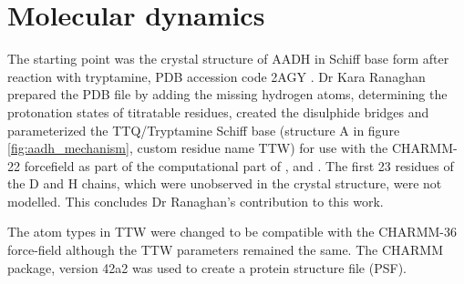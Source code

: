 \section{Molecular dynamics}\label{sec:aadh_md}

The starting point was the crystal structure of AADH in Schiff base form after reaction with tryptamine, PDB accession code 2AGY \cite{masgrauAtomicDescriptionEnzyme2006}. Dr Kara Ranaghan prepared the PDB file by adding the missing hydrogen atoms, determining the protonation states of titratable residues, created the disulphide bridges and parameterized the TTQ/Tryptamine Schiff base (structure A in figure \ref{fig:aadh_mechanism}, custom residue name TTW) for use with the CHARMM-22 forcefield \cite{a.d.mackerellAllAtomEmpiricalPotential1998} as part of the computational part of \cite{masgrauAtomicDescriptionEnzyme2006}, \cite{masgrauTunnelingClassicalPaths2007} and \cite{ranaghanInitioQMMM2017}.  The first 23 residues of the D and H chains, which were unobserved in the crystal structure, were not modelled. This concludes Dr Ranaghan's contribution to this work. 

The atom types in TTW were changed to be compatible with the CHARMM-36 \cite{huangCHARMM36AllatomAdditive2013} force-field although the TTW parameters remained the same. The CHARMM package, version 42a2 \cite{brooksCHARMMBiomolecularSimulation2009} was used to create a protein structure file (PSF). 

